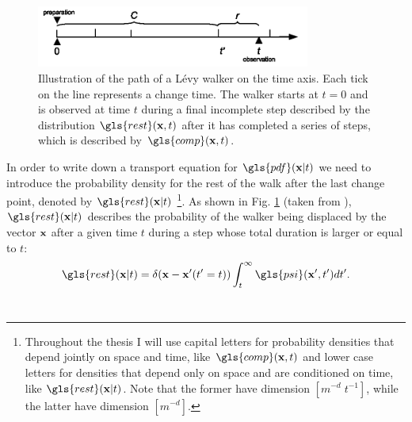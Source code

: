 \begin{figure}
\begin{center}
\includegraphics[width=90mm]{pics/timelineOrdinary.png}
\caption{Illustration of the path of a L\'evy walker on the time axis. Each tick on the line represents a change time. The walker starts at $t=0$ and is observed at time $t$ during a final incomplete step described by the distribution $\gls{rest}(\ve{x},t)$ after it has completed a series of steps, which is described by $\gls{comp}(\ve{x},t)$. 
\label{fig:pdfOrdinary}}
\end{center}
\end{figure}

In order to write down a transport equation for $\gls{pdf}(\ve{x}|t)$ we need to introduce the probability density for the rest of the walk after the last change point, denoted by $\gls{rest}(\ve{x}|t)$
\footnote{
Throughout the thesis I will use capital letters for probability densities that depend jointly on space and time, like $\gls{comp}(\ve{x},t)$ and lower case letters for densities that depend only on space and are conditioned on time, like $\gls{rest}(\ve{x}|t)$. Note that the former have dimension $[m^{-d} \; t^{-1}]$, while the latter have dimension $[m^ {-d}]$.
}. 
As shown in Fig. \ref{fig:pdfOrdinary} (taken from \cite{bothe}), $\gls{rest}(\ve{x}|t)$ describes the probability of the walker being displaced by the vector $\mathbf{ x }$ after a given time $t$ during a step whose total duration is larger or equal to $t$:\\
%
{ \color{blue}
\begin{align}
\gls{rest}(\ve{x}|t) = \delta(\ve{x} - \ve{x}'(t'=t)) \int_{t}^{\infty} \gls{psi}(\ve{x}',t') dt' .
\end{align}
}
%
\\

